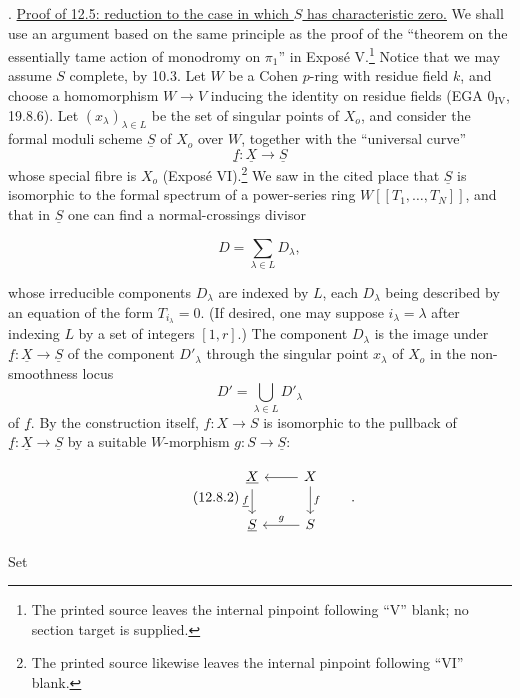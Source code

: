\medskip
{}. \underline{Proof of 12.5: reduction to the case in which $S$ has
characteristic zero.} We shall use an argument based on the same principle
as the proof of the ``theorem on the essentially tame action of monodromy
on $\pi_1$'' in Expos\'e V.\footnote{The printed source leaves the internal
pinpoint following ``V'' blank; no section target is supplied.} Notice that
we may assume $S$ complete, by 10.3. Let $W$ be a Cohen $p$-ring with
residue field $k$, and choose a homomorphism $W\longrightarrow V$ inducing
the identity on residue fields (EGA $0_{\mathrm{IV}}$, 19.8.6). Let
$(x_\lambda)_{\lambda\in L}$ be the set of singular points of $X_o$, and
consider the formal moduli scheme $\underline S$ of $X_o$ over $W$, together
with the ``universal curve''
\[
 \underline f:\underline X\longrightarrow\underline S
\]
whose special fibre is $X_o$ (Expos\'e VI).\footnote{The printed source
likewise leaves the internal pinpoint following ``VI'' blank.} We saw in
the cited place that $\underline S$ is isomorphic to the formal spectrum of
a power-series ring $W[[T_1,\ldots,T_N]]$, and that in $\underline S$ one
can find a normal-crossings divisor

\begin{equation}\tag{12.8.1}
 D=\sum_{\lambda\in L}D_\lambda,
\end{equation}

\noindent
whose irreducible components $D_\lambda$ are indexed by $L$, each
$D_\lambda$ being described by an equation of the form $T_{i_\lambda}=0$.
(If desired, one may suppose $i_\lambda=\lambda$ after indexing $L$ by a
set of integers $[1,r]$.) The component $D_\lambda$ is the image under
$\underline f:\underline X\longrightarrow\underline S$ of the component
$D'_\lambda$ through the singular point $x_\lambda$ of $X_o$ in the
non-smoothness locus
\[
 D'=\bigcup_{\lambda\in L}D'_\lambda
\]
of $\underline f$. By the construction itself,
$f:X\longrightarrow S$ is isomorphic to the pullback of
$\underline f:\underline X\longrightarrow\underline S$ by a suitable
$W$-morphism $g:S\longrightarrow\underline S$:

\begin{equation}\tag{12.8.2}
\begin{tikzcd}
 \underline X \arrow[d,"\underline f"'] &
 X \arrow[l] \arrow[d,"f"] \\
 \underline S & S \arrow[l,"g"']
\end{tikzcd}
\qquad .
\end{equation}

\noindent
Set


